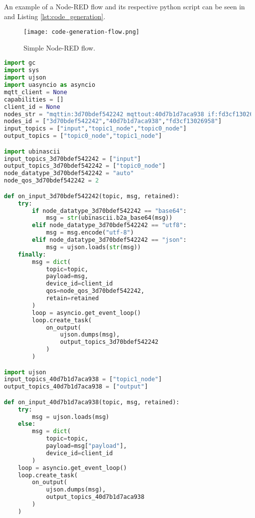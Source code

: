 An example of a Node-RED flow and its respective python script can be seen in  and Listing \ref{lst:code_generation}.

\begin{figure}[h]
    \centering
    \texttt{[image: code-generation-flow.png]}
    \caption{Simple Node-RED flow.}
    \label{fig:code_generation_flow}
\end{figure}

\begin{lstlisting}[language=Python, caption={Code generated from the flow presented in Figure \ref{fig:code_generation_flow}.}, captionpos=b, label={lst:code_generation}]
import gc
import sys
import ujson
import uasyncio as asyncio
mqtt_client = None
capabilities = []
client_id = None
nodes_str = "mqttin:3d70bdef542242 mqttout:40d7b1d7aca938 if:fd3cf13026958"
nodes_id = ["3d70bdef542242","40d7b1d7aca938","fd3cf13026958"]
input_topics = ["input","topic1_node","topic0_node"]
output_topics = ["topic0_node","topic1_node"]

import ubinascii
input_topics_3d70bdef542242 = ["input"]
output_topics_3d70bdef542242 = ["topic0_node"]
node_datatype_3d70bdef542242 = "auto"
node_qos_3d70bdef542242 = 2

def on_input_3d70bdef542242(topic, msg, retained):
    try:
        if node_datatype_3d70bdef542242 == "base64":
            msg = str(ubinascii.b2a_base64(msg))
        elif node_datatype_3d70bdef542242 == "utf8":
            msg = msg.encode("utf-8")
        elif node_datatype_3d70bdef542242 == "json":
            msg = ujson.loads(str(msg))
    finally:
        msg = dict(
            topic=topic,
            payload=msg,
            device_id=client_id
            qos=node_qos_3d70bdef542242,
            retain=retained
        )
        loop = asyncio.get_event_loop()
        loop.create_task(
            on_output(
                ujson.dumps(msg),
                output_topics_3d70bdef542242
            )
        )

import ujson
input_topics_40d7b1d7aca938 = ["topic1_node"]
output_topics_40d7b1d7aca938 = ["output"]

def on_input_40d7b1d7aca938(topic, msg, retained):
    try:
        msg = ujson.loads(msg)
    else:
        msg = dict(
            topic=topic,
            payload=msg["payload"],
            device_id=client_id
        )            
    loop = asyncio.get_event_loop()
    loop.create_task(
        on_output(
            ujson.dumps(msg),
            output_topics_40d7b1d7aca938
        )
    )


\end{lstlisting}
